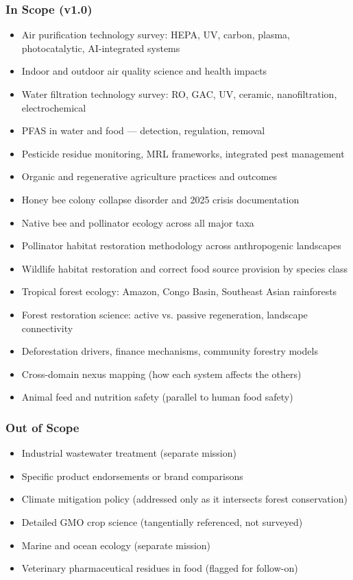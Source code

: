 \documentclass[11pt,letterpaper]{article}
\begin{document}
\subsubsection{In Scope (v1.0)}
\begin{itemize}[leftmargin=*]
  \item Air purification technology survey: HEPA, UV, carbon, plasma, photocatalytic, AI-integrated systems
  \item Indoor and outdoor air quality science and health impacts
  \item Water filtration technology survey: RO, GAC, UV, ceramic, nanofiltration, electrochemical
  \item PFAS in water and food --- detection, regulation, removal
  \item Pesticide residue monitoring, MRL frameworks, integrated pest management
  \item Organic and regenerative agriculture practices and outcomes
  \item Honey bee colony collapse disorder and 2025 crisis documentation
  \item Native bee and pollinator ecology across all major taxa
  \item Pollinator habitat restoration methodology across anthropogenic landscapes
  \item Wildlife habitat restoration and correct food source provision by species class
  \item Tropical forest ecology: Amazon, Congo Basin, Southeast Asian rainforests
  \item Forest restoration science: active vs. passive regeneration, landscape connectivity
  \item Deforestation drivers, finance mechanisms, community forestry models
  \item Cross-domain nexus mapping (how each system affects the others)
  \item Animal feed and nutrition safety (parallel to human food safety)
\end{itemize}

\subsubsection{Out of Scope}
\begin{itemize}[leftmargin=*]
  \item Industrial wastewater treatment (separate mission)
  \item Specific product endorsements or brand comparisons
  \item Climate mitigation policy (addressed only as it intersects forest conservation)
  \item Detailed GMO crop science (tangentially referenced, not surveyed)
  \item Marine and ocean ecology (separate mission)
  \item Veterinary pharmaceutical residues in food (flagged for follow-on)
\end{itemize}
\end{document}

